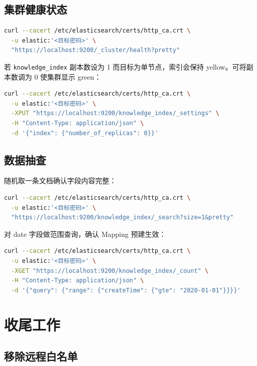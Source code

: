 \documentclass[11pt,a4paper,openany]{ctexbook}
\begin{document}
\section{集群健康状态}

\begin{lstlisting}[language=bash]
curl --cacert /etc/elasticsearch/certs/http_ca.crt \
  -u elastic:'<目标密码>' \
  "https://localhost:9200/_cluster/health?pretty"
\end{lstlisting}

若 \texttt{knowledge\_index} 副本数设为 1 而目标为单节点，索引会保持 yellow。可将副本数调为 0 使集群显示 green：

\begin{lstlisting}[language=bash]
curl --cacert /etc/elasticsearch/certs/http_ca.crt \
  -u elastic:'<目标密码>' \
  -XPUT "https://localhost:9200/knowledge_index/_settings" \
  -H "Content-Type: application/json" \
  -d '{"index": {"number_of_replicas": 0}}'
\end{lstlisting}

\section{数据抽查}

随机取一条文档确认字段内容完整：

\begin{lstlisting}[language=bash]
curl --cacert /etc/elasticsearch/certs/http_ca.crt \
  -u elastic:'<目标密码>' \
  "https://localhost:9200/knowledge_index/_search?size=1&pretty"
\end{lstlisting}

对 date 字段做范围查询，确认 Mapping 预建生效：

\begin{lstlisting}[language=bash]
curl --cacert /etc/elasticsearch/certs/http_ca.crt \
  -u elastic:'<目标密码>' \
  -XGET "https://localhost:9200/knowledge_index/_count" \
  -H "Content-Type: application/json" \
  -d '{"query": {"range": {"createTime": {"gte": "2020-01-01"}}}}'
\end{lstlisting}

\chapter{收尾工作}

\section{移除远程白名单}
\end{document}
